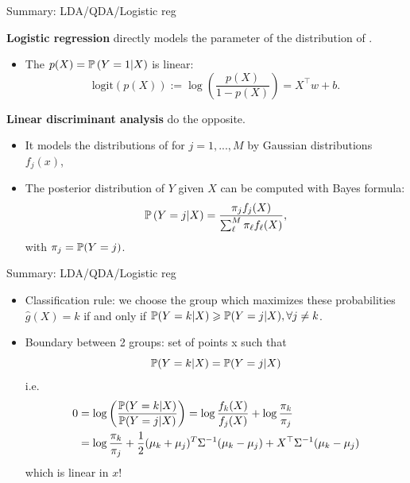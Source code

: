 \documentclass[xcolor={usenames,dvipsnames}]{beamer}
\begin{document}
\begin{frame}{Summary: LDA/QDA/Logistic reg}


 \textbf{Logistic regression} directly models the parameter of the distribution of .

\begin{itemize}
\item The  $p(X)=\P\left(  Y = 1 | X \right)$  is \alert{linear}:
$$
\mathrm{logit} (p(X)) := \log\left( \frac{p(X)}{1-p(X)} \right) = X^\top w + b.
$$
\end{itemize}

\textbf{Linear discriminant analysis} do the opposite. 

\begin{itemize}
\item It models the distributions of  for $j = 1,...,M$ by Gaussian distributions $f_j(x)$,
\item  The posterior distribution of $Y$ given $X$ can be computed with Bayes formula:
$$
\P \left( Y =j | X \right) = \frac{\pi_j f_j(X) }{\sum_\ell^M \pi_\ell f_\ell(X)},
$$
with $\pi_j = \P(Y=j)$.
\end{itemize}

\end{frame}

\begin{frame}{Summary: LDA/QDA/Logistic reg}

\begin{itemize}
\item Classification rule: we choose the group which maximizes these probabilities
$\hat{g}(X)=k$ if and only if $\P(Y=k|X)\geq \P(Y=j|X), \forall j \neq k$.
\item Boundary between 2 groups: set of points x such that 
$$\P (Y =k|X )=\P(Y =j|X )$$
i.e.\
\begin{align*}
0 &= \log\left(\frac{\P (Y =k|X)}{\P(Y =j|X)} \right) =  \log\frac{f_k(X)}{f_j(X)}+ 	\log\frac{\pi_k}{\pi_j} \\
&= \log\frac{\pi_k}{\pi_j} + \frac{1}{2} (\mu_k + \mu_j)^T \Sigma^{-1} (\mu_k - \mu_j) + X^\top \Sigma^{-1} (\mu_k - \mu_j)
\end{align*}
which is \alert{linear} in $x$!
\end{itemize}

\end{frame}

%
%
\end{document}
